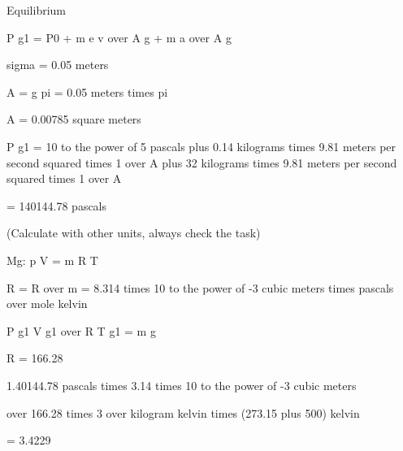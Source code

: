 Equilibrium

P g1 = P0 + m e v over A g + m a over A g

sigma = 0.05 meters

A = g pi = 0.05 meters times pi

A = 0.00785 square meters

P g1 = 10 to the power of 5 pascals plus 0.14 kilograms times 9.81 meters per second squared times 1 over A plus 32 kilograms times 9.81 meters per second squared times 1 over A

= 140144.78 pascals

(Calculate with other units, always check the task)

Mg: p V = m R T

R = R over m = 8.314 times 10 to the power of -3 cubic meters times pascals over mole kelvin

P g1 V g1 over R T g1 = m g

R = 166.28

1.40144.78 pascals times 3.14 times 10 to the power of -3 cubic meters

over 166.28 times 3 over kilogram kelvin times (273.15 plus 500) kelvin

= 3.4229